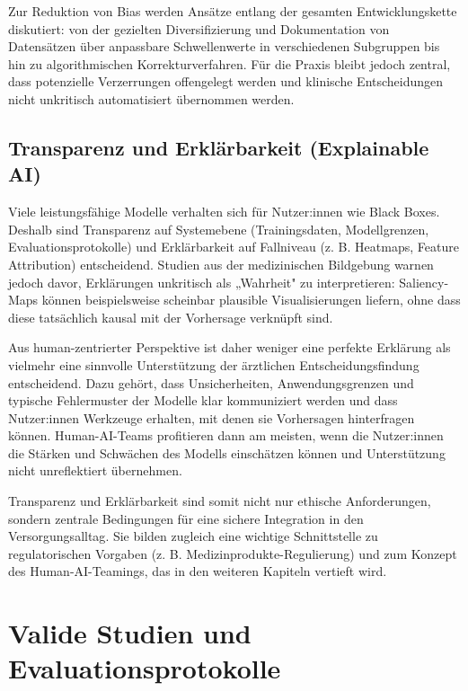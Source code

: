 \documentclass[lettersize,journal]{IEEEtran}
\begin{document}
Zur Reduktion von Bias werden Ansätze entlang der gesamten Entwicklungskette diskutiert: von der gezielten Diversifizierung und Dokumentation von Datensätzen über anpassbare Schwellenwerte in verschiedenen Subgruppen bis hin zu algorithmischen Korrekturverfahren\cite{ref:celi2022bias}\cite{ref:hai2025aiindex}. Für die Praxis bleibt jedoch zentral, dass potenzielle Verzerrungen offengelegt werden und klinische Entscheidungen nicht unkritisch automatisiert übernommen werden.

\subsection{Transparenz und Erklärbarkeit (Explainable AI)}
\label{subsec:xai}

Viele leistungsfähige Modelle verhalten sich für Nutzer:innen wie Black Boxes. Deshalb sind Transparenz auf Systemebene (Trainingsdaten, Modellgrenzen, Evaluationsprotokolle) und Erklärbarkeit auf Fallniveau (z. B. Heatmaps, Feature Attribution) entscheidend\cite{ref:hai2025aiindex}\cite{ref:chen2022}. Studien aus der medizinischen Bildgebung warnen jedoch davor, Erklärungen unkritisch als „Wahrheit" zu interpretieren: Saliency-Maps können beispielsweise scheinbar plausible Visualisierungen liefern, ohne dass diese tatsächlich kausal mit der Vorhersage verknüpft sind\cite{ref:chen2022}.

Aus human-zentrierter Perspektive ist daher weniger eine perfekte Erklärung als vielmehr eine sinnvolle Unterstützung der ärztlichen Entscheidungsfindung entscheidend\cite{ref:chen2022}. Dazu gehört, dass Unsicherheiten, Anwendungsgrenzen und typische Fehlermuster der Modelle klar kommuniziert werden und dass Nutzer:innen Werkzeuge erhalten, mit denen sie Vorhersagen hinterfragen können. Human-AI-Teams profitieren dann am meisten, wenn die Nutzer:innen die Stärken und Schwächen des Modells einschätzen können und Unterstützung nicht unreflektiert übernehmen.

Transparenz und Erklärbarkeit sind somit nicht nur ethische Anforderungen, sondern zentrale Bedingungen für eine sichere Integration in den Versorgungsalltag\cite{ref:hai2025aiindex}\cite{ref:chen2022}. Sie bilden zugleich eine wichtige Schnittstelle zu regulatorischen Vorgaben (z. B. Medizinprodukte-Regulierung) und zum Konzept des Human-AI-Teamings, das in den weiteren Kapiteln vertieft wird.

	
	
\section{Valide Studien und Evaluationsprotokolle}
\end{document}
